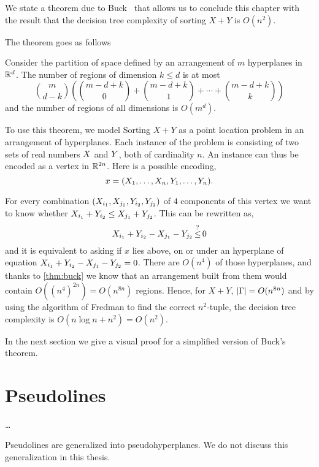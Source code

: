 We state a theorem due to Buck~\cite{Bu43} that allows us to conclude
this chapter with the result that the decision tree complexity of sorting
\(X + Y\) is \(O(n^2)\).

The theorem goes as follows
\begin{theorem}\label{thm:buck}
Consider the partition of space defined by an arrangement of $m$ hyperplanes in
$\mathbb{R}^d$.
The number of regions of dimension $k \le d$ is at most
\begin{displaymath}
	{m \choose d-k}
	\left(
		{m-d+k \choose 0}
		+
		{m-d+k \choose 1}
		+
		\cdots
		+
		{m-d+k \choose k}
	\right)
\end{displaymath}
and the number of regions of all dimensions is \(O(m^d)\).
\end{theorem}

To use this theorem, we model Sorting \(X + Y\) as a point location problem in an
arrangement of hyperplanes. Each instance of the problem is consisting of two
sets of real numbers $X$ and $Y$, both of cardinality $n$. An instance can
thus be encoded as a vertex in $\mathbb{R}^{2n}$. Here is a possible encoding,
\begin{displaymath}
x = (X_1, \ldots, X_n, Y_1, \ldots, Y_n).
\end{displaymath}

For every combination $(X_{i_1}, X_{j_1}, Y_{i_2}, Y_{j_2})$ of $4$
components of this vertex we want to know whether $X_{i_1} + Y_{i_2} \le
X_{j_1} + Y_{j_2}$. This can be rewritten as,
$$X_{i_1} + Y_{i_2} - X_{j_1} - Y_{j_2} \mathop{\le}^{?} 0$$
and it is equivalent to asking if $x$ lies above, on or under an
hyperplane of equation $X_{i_1} + Y_{i_2} - X_{j_1} - Y_{j_2} = 0$. There
are \(O(n^4)\) of those hyperplanes, and thanks to \ref{thm:buck}
we know that an arrangement built from them would contain
\(O({(n^4)}^{2n}) = O(n^{8n})\) regions. Hence, for \(X+Y\), \(|{\Gamma}| =
O(n^{8n})\) and by using the algorithm of Fredman to find the correct
$n^2$-tuple, the decision tree complexity is
\(O(n \log n + n^2) = O(n^2)\).

In the next section we give a visual proof for a simplified version of
Buck's theorem.



\section{Pseudolines}
\dots

Pseudolines are generalized into pseudohyperplanes. We do not discuss this
generalization in this thesis.

